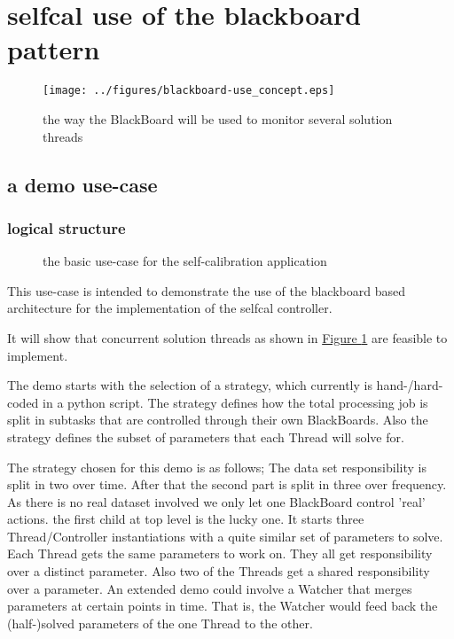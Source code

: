\documentclass[]{lofar}
\begin{document}
  \section{selfcal use of the blackboard pattern}
  \label{id2712500}\hypertarget{id2712500}{}%
  \begin{figure}
    \texttt{[image: ../figures/blackboard-use\_concept.eps]}
    \hypertarget{figure-blackboard-use}{}
    \caption{the way the BlackBoard will be used to monitor several
    solution threads\label{figure-blackboard-use}}
  \end{figure}

    \subsection{a demo use-case}
    \label{id2719741}\hypertarget{id2719741}{}%
      \subsubsection{logical structure}
      \label{id2719712}\hypertarget{id2719712}{}%
      \begin{figure}
        \hypertarget{demo-usecase}{}
        \caption{the basic use-case for the self-calibration application\label{figure-demo-usecase}}
      \end{figure}

      This use-case is intended to demonstrate the use of the
      blackboard based architecture for the implementation of the
      selfcal controller.

      It will show that concurrent solution threads as shown in
      \hyperlink{figure-blackboard-use}{Figure
      \ref{figure-blackboard-use}} are feasible to implement.

      The demo starts with the selection of a strategy, which
      currently is hand-/hard-coded in a python script. The strategy
      defines how the total processing job is split in subtasks that
      are controlled through their own BlackBoards. Also the strategy
      defines the subset of parameters that each Thread will solve
      for.

      The strategy chosen for this demo is as follows; The data set
      responsibility is split in two over time. After that the second
      part is split in three over frequency. As there is no real
      dataset involved we only let one BlackBoard control 'real'
      actions. the first child at top level is the lucky one. It
      starts three Thread/Controller instantiations with a quite
      similar set of parameters to solve. Each Thread gets the same
      parameters to work on. They all get responsibility over a
      distinct parameter. Also two of the Threads get a shared
      responsibility over a parameter. An extended demo could involve
      a Watcher that merges parameters at certain points in time. That
      is, the Watcher would feed back the (half-)solved parameters of
      the one Thread to the other.
\end{document}
